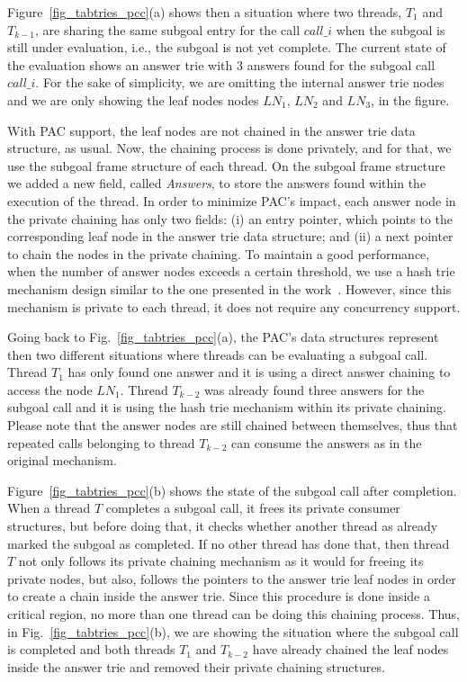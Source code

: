 \documentclass{llncs}
\begin{document}
Figure~\ref{fig_tabtries_pcc}(a) shows then a situation where two
threads, $T_1$ and $T_{k-1}$, are sharing the same subgoal entry for
the call $call\_i$ when the subgoal is still under evaluation, i.e.,
the subgoal is not yet complete. The current state of the evaluation
shows an answer trie with 3 answers found for the subgoal call
$call\_i$. For the sake of simplicity, we are omitting the internal
answer trie nodes and we are only showing the leaf nodes nodes $LN_1$,
$LN_2$ and $LN_3$, in the figure.

With PAC support, the leaf nodes are not chained in the answer trie
data structure, as usual. Now, the chaining process is done privately,
and for that, we use the subgoal frame structure of each thread. On
the subgoal frame structure we added a new field, called
\emph{Answers}, to store the answers found within the execution of the
thread. In order to minimize PAC's impact, each answer node in the
private chaining has only two fields: (i) an entry pointer, which
points to the corresponding leaf node in the answer trie data
structure; and (ii) a next pointer to chain the nodes in the private
chaining. To maintain a good performance, when the number of answer
nodes exceeds a certain threshold, we use a hash trie mechanism design
similar to the one presented in the
work~\cite{Areias-ijpp15}. However, since this mechanism is private to
each thread, it does not require any concurrency support.

Going back to Fig.~\ref{fig_tabtries_pcc}(a), the PAC's data
structures represent then two different situations where threads can
be evaluating a subgoal call. Thread $T_1$ has only found one answer
and it is using a direct answer chaining to access the node
$LN_1$. Thread $T_{k-2}$ was already found three answers for the
subgoal call and it is using the hash trie mechanism within its
private chaining. Please note that the answer nodes are still chained
between themselves, thus that repeated calls belonging to thread
$T_{k-2}$ can consume the answers as in the original mechanism.

Figure~\ref{fig_tabtries_pcc}(b) shows the state of the subgoal call
after completion. When a thread $T$ completes a subgoal call, it frees
its private consumer structures, but before doing that, it checks
whether another thread as already marked the subgoal as completed. If
no other thread has done that, then thread $T$ not only follows its
private chaining mechanism as it would for freeing its private nodes,
but also, follows the pointers to the answer trie leaf nodes in order
to create a chain inside the answer trie. Since this procedure is done
inside a critical region, no more than one thread can be doing this
chaining process. Thus, in Fig.~\ref{fig_tabtries_pcc}(b), we are
showing the situation where the subgoal call is completed and both
threads $T_1$ and $T_{k-2}$ have already chained the leaf nodes inside
the answer trie and removed their private chaining structures.
\end{document}
